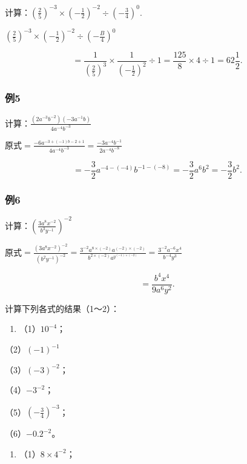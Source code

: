 计算：\(\left(\frac{2}{5}\right)^{-3} \times \left(-\frac{1}{2}\right)^{-2} \div \left(-\frac{3}{4}\right)^0.\)

\(\left(\frac{2}{5}\right)^{-3} \times \left(-\frac{1}{2}\right)^{-2} \div \left(-\frac{B}{4}\right)^0\)

\[
= \frac{1}{\left(\frac{2}{5}\right) ^ {3}} \times \frac{1}{\left(- \frac{1}{2}\right) ^ {2}} \div 1 = \frac{125}{8} \times 4 \div 1 = 62 \frac{1}{2}.
\]

\subsubsection{例5}

计算：\(\frac{(2a^{-3}b^{-2})(-3a^{-1}b)}{4a^{-4}b^{-3}}\)

原式\(= \frac{-6a^{-3 + (-1)b - 2 + 1}}{4a^{-4}b^{-3}} = \frac{-3a^{-4}b^{-1}}{2a^{-4}b^{-8}}\)

\[
= - \frac{3}{2} a ^ {- 4 - (- 4)} b ^ {- 1 - (- 8)} = - \frac{3}{2} a ^ {6} b ^ {2} = - \frac{3}{2} b ^ {2}.
\]

\subsubsection{例6}

计算：\(\left(\frac{3a^8x^{-2}}{b^3y^{-1}}\right)^{-2}\)

原式\(= \frac{(3a^8x^{-2})^{-2}}{(b^2y^{-1})^{-2}} = \frac{3^{-2}a^{8\times(-2)}a^{(-2)\times(-2)}}{b^{2\times(-2)}a^{y^{(-1)\times(-2)}}} = \frac{3^{-2}a^{-6}x^4}{b^{-4}y^3}\)

\[
= \frac{b ^ {4} x ^ {4}}{9 a ^ {6} y ^ {2}}.
\]

计算下列各式的结果（1～2）：

\begin{enumerate}
\item
  （1）\(10^{-4}\)；
\end{enumerate}

（2）\((-1)^{-1}\)

（3）\((-3)^{-2}\)；

（4）\(-3^{-2}\)；

（5）\(\left(-\frac{3}{4}\right)^{-3}\)；

（6）\(-0.2^{-2}\)。

\begin{enumerate}[start=2]
\item
  （1）\(8 \times 4^{-2}\)；
\end{enumerate}

